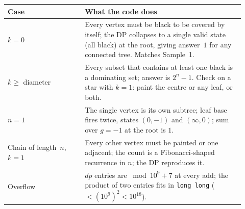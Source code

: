 
\begin{center}\renewcommand{\arraystretch}{1.2}
\begin{tabular}{@{}p{0.30\linewidth} p{0.62\linewidth}@{}}
\toprule
\textbf{Case} & \textbf{What the code does} \\
\midrule
$k = 0$ & Every vertex must be black to be covered by itself; the DP collapses to a single valid state (all black) at the root, giving answer~$1$ for any connected tree. Matches Sample~1. \\
$k \ge$ diameter & Every subset that contains at least one black is a dominating set; answer is $2^n - 1$. Check on a star with $k = 1$: paint the centre or any leaf, or both. \\
$n = 1$ & The single vertex is its own subtree; leaf base fires twice, states $(0, -1)$ and $(\infty, 0)$; sum over $g = -1$ at the root is $1$. \\
Chain of length~$n$, $k = 1$ & Every other vertex must be painted or one adjacent; the count is a Fibonacci-shaped recurrence in $n$; the DP reproduces it. \\
Overflow & $\mathit{dp}$ entries are $\bmod 10^9{+}7$ at every add; the product of two entries fits in \lstinline{long long} ($< (10^9)^2 < 10^{18}$). \\
\bottomrule
\end{tabular}\end{center}

